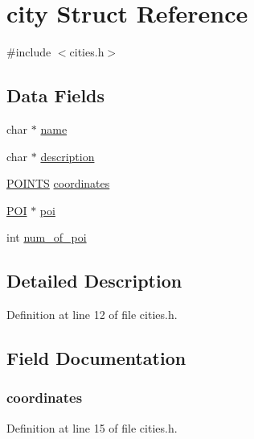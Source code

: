 \hypertarget{structcity}{}\section{city Struct Reference}
\label{structcity}


{\ttfamily \#include $<$cities.\+h$>$}

\subsection*{Data Fields}
\begin{DoxyCompactItemize}
\item 
char $\ast$ \hyperlink{structcity_a5ac083a645d964373f022d03df4849c8}{name}
\item 
char $\ast$ \hyperlink{structcity_a8444d6e0dfe2bbab0b5e7b24308f1559}{description}
\item 
\hyperlink{points_8h_a4235e0da1bb8e33e5a037d66cdccb36e}{P\+O\+I\+N\+T\+S} \hyperlink{structcity_a0b1668b066c9fac194d4768a81db2f6b}{coordinates}
\item 
\hyperlink{poi_8h_ac802fb90706f3390e612abad946c909c}{P\+O\+I} $\ast$ \hyperlink{structcity_a0c8507eac9b0547e9b75772dae17b800}{poi}
\item 
int \hyperlink{structcity_aead4207565357706b17fe7e9414bafac}{num\+\_\+of\+\_\+poi}
\end{DoxyCompactItemize}


\subsection{Detailed Description}


Definition at line 12 of file cities.\+h.



\subsection{Field Documentation}
\hypertarget{structcity_a0b1668b066c9fac194d4768a81db2f6b}{}
\subsubsection[{coordinates}]{ coordinates}\label{structcity_a0b1668b066c9fac194d4768a81db2f6b}


Definition at line 15 of file cities.\+h.

